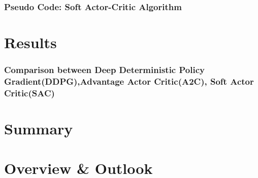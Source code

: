 \documentclass[a4paper]{report}
\begin{document}
\subsection{Pseudo Code: Soft Actor-Critic Algorithm}






\chapter{Results}
\label{ch:results}

\subsection{Comparison between Deep Deterministic Policy Gradient(DDPG),Advantage Actor Critic(A2C), Soft Actor Critic(SAC)}











\chapter{Summary}
\label{ch:summary}







\chapter{Overview \& Outlook}
\label{ch:Evaluation}









\end{document}
